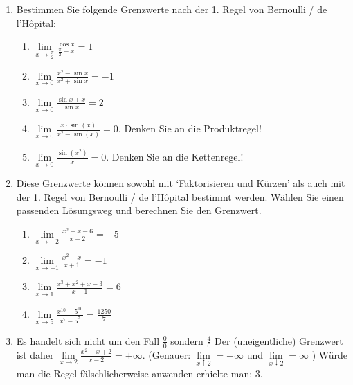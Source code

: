 \begin{enumerate}
    \item Bestimmen Sie folgende Grenzwerte nach der 1. Regel von Bernoulli / de l'Hôpital:
    \begin{enumerate}
        \item $\lim\limits_{x \to \frac{\pi}{2}} \frac{\cos x}{\frac{\pi}{2} - x} = 1$
        \item $\lim\limits_{x \to 0} \frac{x^2 - \sin x}{x^2 + \sin x} = -1$
        \item $\lim\limits_{x \to 0} \frac{\sin x + x}{\sin x} = 2$
        \item $\lim\limits_{x \to 0} \frac{x \cdot \sin(x)}{x^2 - \sin(x)} = 0 $. Denken Sie an die Produktregel!
        \item $\lim\limits_{x \to 0} \frac{\sin(x^2)}{x} = 0$. Denken Sie an die Kettenregel!
    \end{enumerate}
    
    \item Diese Grenzwerte können sowohl mit `Faktorisieren und Kürzen' als auch mit der 1. Regel von Bernoulli / de l'Hôpital bestimmt werden. Wählen Sie einen passenden Lösungsweg und berechnen Sie den Grenzwert.
    \begin{enumerate}
        \item $\lim\limits_{x \to -2} \frac{x^2 - x - 6}{x + 2} = -5$
        \item $\lim\limits_{x \to -1} \frac{x^2 + x}{x + 1} = -1$
        \item $\lim\limits_{x \to 1} \frac{x^3+x^2 + x - 3}{x - 1} = 6$
        
        \item $\lim\limits_{x \to 5} \frac{x^{10} - 5^{10}}{x^7 - 5^7} = \frac{1250}{7}$
    \end{enumerate}
    
    
    \item Es handelt sich nicht um den Fall $\frac{0}{0}$ sondern $\frac{4}{0}$ Der (uneigentliche) Grenzwert ist daher $\lim\limits_{x \to 2} \frac{x^2 - x + 2}{x - 2} = \pm\infty$. (Genauer: $\lim\limits_{x \uparrow 2} = -\infty$ und $\lim\limits_{x \downarrow 2} = \infty$  ) Würde man die Regel fälschlicherweise anwenden erhielte man: $3$.


\end{enumerate}
